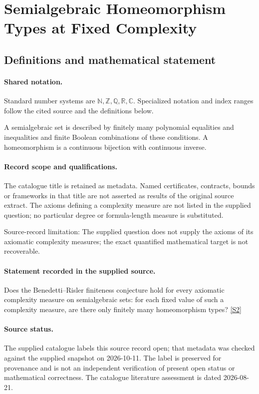 \documentclass[11pt]{article}
\newcommand{\sref}[2]{\hyperlink{source:#1:#2}{[S#2]}}
\begin{document}
\section{Semialgebraic Homeomorphism Types at Fixed Complexity}\label{statement}

\subsection{Definitions and mathematical statement}

\paragraph{Shared notation.}Standard number systems are $\mathbb N,\mathbb Z,\mathbb Q,\mathbb R,\mathbb C$. Specialized notation and index ranges follow the cited source and the definitions below.


A semialgebraic set is described by finitely many polynomial equalities and inequalities and finite Boolean combinations of these conditions. A homeomorphism is a continuous bijection with continuous inverse.
\paragraph{Record scope and qualifications.}
The catalogue title is retained as metadata. Named certificates, contracts, bounds or frameworks in that title are not asserted as results of the original source extract.
The axioms defining a complexity measure are not listed in the supplied question; no particular degree or formula-length measure is substituted.

Source-record limitation: The supplied question does not supply the axioms of its axiomatic complexity measures; the exact quantified mathematical target is not recoverable.
\paragraph{Statement recorded in the supplied source.}
Does the Benedetti–Risler finiteness conjecture hold for every axiomatic complexity measure on semialgebraic sets: for each fixed value of such a complexity measure, are there only finitely many homeomorphism types? \sref{statement}{2}
\paragraph{Source status.}
The supplied catalogue labels this source record open; that metadata was checked against the supplied snapshot on 2026-10-11. The label is preserved for provenance and is not an independent verification of present open status or mathematical correctness. The catalogue literature assessment is dated 2026-08-21.
\end{document}
